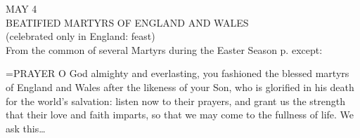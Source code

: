 \begin{center}\normalsize MAY 4\\
\footnotesize BEATIFIED MARTYRS OF ENGLAND AND WALES\\
\footnotesize (celebrated only in England: feast)\\
\footnotesize From the common of several Martyrs during the Easter Season p.     except:\\
\end{center}

\hangindent=\parindent \small{PRAYER 
O God almighty and everlasting, you fashioned the blessed
martyrs of England and Wales after the likeness of your Son, who
is glorified in his death for the world’s salvation: listen now to their
prayers, and grant us the strength that their love and faith imparts, so
that we may come to the fullness of life. We ask this…\\}
 
